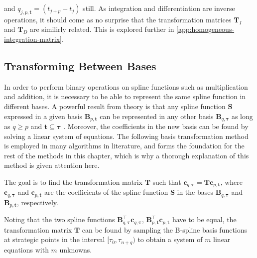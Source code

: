 and $q_{j,p,\mathbf{t}} = (t_{j+p}-t_j)$ still.
As integration and differentiation are inverse operations, it should come as no surprise that the transformation matrices $\mathbf T_I$ and $\mathbf T_D$ are similirly related. This is explored further in \cref{app:homogeneous-integration-matrix}.


\subsection{Transforming Between Bases}\label{sec:basis-transformation}
In order to perform binary operations on spline functions such as multiplication and addition, it is necessary to be able to represent the same spline function in different bases. A powerful result from theory is that any spline function $\mathbf S$ expressed in a given basis $\mathbf B_{p,\mathbf t}$ can be represented in any other basis $\mathbf B_{q,\boldsymbol \tau}$ as long as $q \geq p$ and $\mathbf t \subseteq \boldsymbol \tau$ \citep{Grimstad2016}. Moreover, the coefficients in the new basis can be found by solving a linear system of equations. The following basis transformation method is employed in many algorithms in literature, and forms the foundation for the rest of the methods in this chapter, which is why a thorough explanation of this method is given attention here.

The goal is to find the transformation matrix $\mathbf T$ such that $\mathbf c_{q, \boldsymbol \tau} = \mathbf T \mathbf c_{p, \mathbf t}$, where $\mathbf c_{q, \boldsymbol \tau}$ and $\mathbf c_{p, \mathbf t}$ are the coefficients of the spline function $\mathbf S$ in the bases $\mathbf B_{q,\boldsymbol \tau}$ and $\mathbf B_{p,\mathbf t}$, respectively.

Noting that the two spline functions $\mathbf B_{q,\boldsymbol \tau}^\top \mathbf c_{q, \boldsymbol \tau}$, $\mathbf B_{p,\mathbf t}^\top \mathbf c_{p, \mathbf t}$ have to be equal,
the transformation matrix $\mathbf T$ can be found by sampling the B-spline basis functions at strategic points in the interval $[\tau_0, \tau_{n+q})$ to obtain a system of $m$ linear equations with $m$ unknowns.

